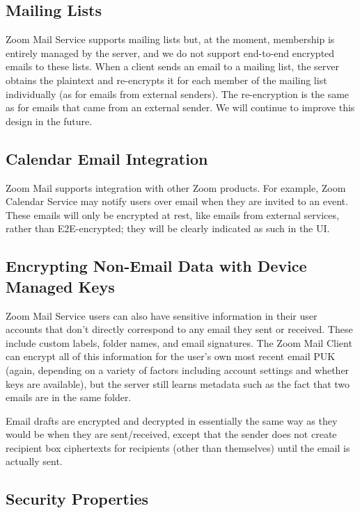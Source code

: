 \subsection{Mailing Lists}

Zoom Mail Service supports mailing lists but, at the moment, membership is entirely managed by the
server, and we do not support end-to-end encrypted emails to these lists. When a client sends an
email to a mailing list, the server obtains the plaintext and re-encrypts it for each member of the
mailing list individually (as for emails from external senders). The re-encryption is the same as
for emails that came from an external sender. We will continue to improve this design in the future.

\subsection{Calendar Email Integration}

Zoom Mail supports integration with other Zoom products. For example, Zoom Calendar Service may
notify users over email when they are invited to an event. These emails will only be encrypted at
rest, like emails from external services, rather than E2E-encrypted; they will be clearly indicated
as such in the UI.

\subsection{Encrypting Non-Email Data with Device Managed Keys}

Zoom Mail Service users can also have sensitive information in their user accounts that don't
directly correspond to any email they sent or received. These include custom labels, folder names,
and email signatures. The Zoom Mail Client can encrypt all of this information for the user's own
most recent email PUK (again, depending on a variety of factors including account settings and
whether keys are available), but the server still learns metadata such as the fact that two emails
are in the same folder.

Email drafts are encrypted and decrypted in essentially the same way as they would be when they are
sent/received, except that the sender does not create recipient box ciphertexts for recipients
(other than themselves) until the email is actually sent.

\subsection{Security Properties}

